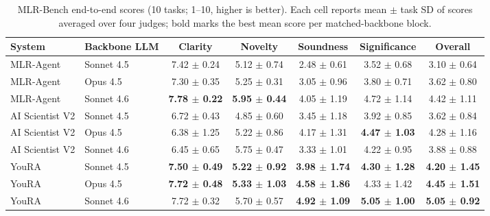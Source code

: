 \begin{table}[t]
\centering
\small
\begin{tabular}{llccccc}
\toprule
System & Backbone LLM & Clarity & Novelty & Soundness & Significance & Overall \\
\midrule
MLR-Agent & Sonnet 4.5 & 7.42 $\pm$ 0.24 & 5.12 $\pm$ 0.74 & 2.48 $\pm$ 0.61 & 3.52 $\pm$ 0.68 & 3.10 $\pm$ 0.64 \\
MLR-Agent & Opus 4.5 & 7.30 $\pm$ 0.35 & 5.25 $\pm$ 0.31 & 3.05 $\pm$ 0.96 & 3.80 $\pm$ 0.71 & 3.62 $\pm$ 0.80 \\
MLR-Agent & Sonnet 4.6 & \textbf{7.78 $\pm$ 0.22} & \textbf{5.95 $\pm$ 0.44} & 4.05 $\pm$ 1.19 & 4.72 $\pm$ 1.14 & 4.42 $\pm$ 1.11 \\
\midrule
AI Scientist V2 & Sonnet 4.5 & 6.72 $\pm$ 0.43 & 4.85 $\pm$ 0.60 & 3.45 $\pm$ 1.18 & 3.92 $\pm$ 0.85 & 3.62 $\pm$ 0.84 \\
AI Scientist V2 & Opus 4.5 & 6.38 $\pm$ 1.25 & 5.22 $\pm$ 0.86 & 4.17 $\pm$ 1.31 & \textbf{4.47 $\pm$ 1.03} & 4.28 $\pm$ 1.16 \\
AI Scientist V2 & Sonnet 4.6 & 6.45 $\pm$ 0.65 & 5.75 $\pm$ 0.47 & 3.33 $\pm$ 1.01 & 4.22 $\pm$ 0.95 & 3.88 $\pm$ 0.88 \\
\midrule
YouRA & Sonnet 4.5 & \textbf{7.50 $\pm$ 0.49} & \textbf{5.22 $\pm$ 0.92} & \textbf{3.98 $\pm$ 1.74} & \textbf{4.30 $\pm$ 1.28} & \textbf{4.20 $\pm$ 1.45} \\
YouRA & Opus 4.5 & \textbf{7.72 $\pm$ 0.48} & \textbf{5.33 $\pm$ 1.03} & \textbf{4.58 $\pm$ 1.86} & 4.33 $\pm$ 1.42 & \textbf{4.45 $\pm$ 1.51} \\
YouRA & Sonnet 4.6 & 7.72 $\pm$ 0.32 & 5.70 $\pm$ 0.57 & \textbf{4.92 $\pm$ 1.09} & \textbf{5.05 $\pm$ 1.00} & \textbf{5.05 $\pm$ 0.92} \\
\bottomrule
\end{tabular}
\caption{MLR-Bench end-to-end scores (10 tasks; 1--10, higher is better). Each cell reports mean $\pm$ task SD of scores averaged over four judges; bold marks the best mean score per matched-backbone block.}
\end{table}
